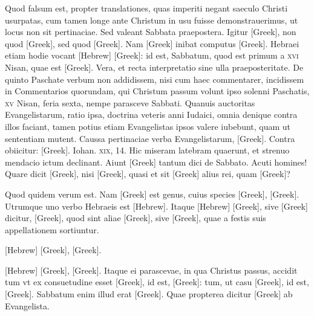 \begin{parnumbers}
{}
Quod falsum est,
propter translationes, quas imperiti negant saeculo Christi usurpatas,
cum tamen longe ante Christum in usu fuisse demonstrauerimus,
ut locus non sit pertinaciae.
\lnr{}Sed valeant Sabbata praepostera.
\lnr{}Igitur \textgreek{[Greek]}, non quod \textgreek{[Greek]}, sed
quod \textgreek{[Greek]}.
\lnr{}Nam \textgreek{[Greek]} inibat
computus \textgreek{[Greek]}.
\lnr{}Hebraei etiam hodie vocant \texthebrew{[Hebrew]}
\textgreek{[Greek]}: id est, Sabbatum, quod est primum a
\textsc{xvi} Nisan, quae est \textgreek{[Greek]}.
\lnr{}Vera, et recta interpretatio sine ulla praeposteritate.
\lnr{}De quinto Paschate verbum non addidissem,
nisi cum haec commentarer, incidissem in Commentarios quorundam,
qui Christum passum volunt ipso solenni Paschatis, \textsc{xv}
Nisan, feria sexta, nempe parasceve Sabbati.
\lnr{}Quanuis auctoritas
Evangelistarum, ratio ipsa, doctrina veteris anni Iudaici, omnia
denique contra illos faciant, tamen potius etiam Evangelistas ipsos
valere iubebunt, quam ut sententiam mutent.
\lnr{}Caussa pertinaciae
verba Evangelistarum, \textgreek{[Greek]}.
\lnr{}Contra obiicitur:
\textgreek{[Greek]}.
\lnr{}Iohan. \textsc{xix}, 14.
\lnr{}Hic miseram latebram quaerunt,
et strenuo mendacio ictum declinant.
\lnr{}Aiunt \textgreek{[Greek]} tantum
dici de Sabbato.
\lnr{}Acuti homines!
\lnr{}Quare dicit \textgreek{[Greek]},
nisi \textgreek{[Greek]}, quasi et sit \textgreek{[Greek]}
 alius rei, quam \textgreek{[Greek]}?
 
Quod quidem verum est.
\lnr{}Nam \textgreek{[Greek]} est genus, cuius species
\textgreek{[Greek]}, \textgreek{[Greek]}.
\lnr{}Utrumque uno verbo Hebraeis est
\texthebrew{[Hebrew]}.
\lnr{}Itaque \texthebrew{[Hebrew]} \textgreek{[Greek]},
 sive \textgreek{[Greek]} dicitur,
\textgreek{[Greek]}, quod sint aliae \textgreek{[Greek]},
 sive \textgreek{[Greek]}, quae a festis
suis appellationem sortiuntur.

\texthebrew{[Hebrew]} \textgreek{[Greek]}, \textgreek{[Greek]}.

\texthebrew{[Hebrew]} \textgreek{[Greek]}, \textgreek{[Greek]}.
\lnr{}Itaque ei parascevae, in qua Christus passus, accidit tum
vt ex consuetudine esset \textgreek{[Greek]}, id est, \textgreek{[Greek]}:
tum, ut casu \textgreek{[Greek]}, id est, \textgreek{[Greek]}.
\lnr{}Sabbatum enim
illud erat \textgreek{[Greek]}.
\lnr{}Quae propterea dicitur \textgreek{[Greek]}
ab Evangelista.


\end{parnumbers}
